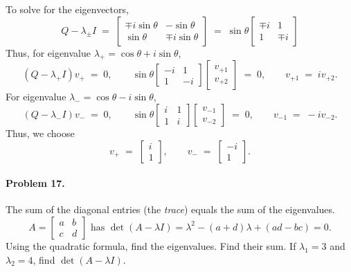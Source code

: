 \documentclass[10pt]{article}
\begin{document}
        To solve for the eigenvectors,
        \[
        Q - \lambda_{\pm}I \;=\; \begin{bmatrix}
                \mp i\sin\theta & -\sin\theta \\ \sin\theta & \mp i\sin\theta
        \end{bmatrix}
        \;=\; \sin\theta \begin{bmatrix}
                \mp i & 1 \\ 1 & \mp i
        \end{bmatrix}
        \]
        Thus, for eigenvalue $\lambda_+ = \cos\theta + i\sin\theta$,
        \[
                (Q - \lambda_+I)v_+ \;=\; 0, \quad\quad \sin\theta \begin{bmatrix}
                        -i & 1 \\ 1 & -i
                \end{bmatrix} \begin{bmatrix}
                        v_{+1} \\ v_{+2}
                \end{bmatrix} \;=\; 0, \quad\quad
                v_{+1} \;=\; iv_{+2}.
        \]
        For eigenvalue $\lambda_- = \cos\theta - i\sin\theta$,
        \[
                (Q - \lambda_-I)v_- \;=\; 0, \quad\quad \sin\theta \begin{bmatrix}
                        i & 1 \\ 1 & i
                \end{bmatrix} \begin{bmatrix}
                        v_{-1} \\ v_{-2}
                \end{bmatrix} \;=\; 0, \quad\quad
                v_{-1} \;=\; -iv_{-2}.
        \]
        Thus, we choose
        \[
                v_+ \;=\; \begin{bmatrix}
                        i \\ 1
                \end{bmatrix}, \quad\quad
                v_- \;=\; \begin{bmatrix}
                        -i \\ 1
                \end{bmatrix}.
        \]



        \paragraph{Problem 17.}
        The sum of the diagonal entries (the \textit{trace}) equals the sum of the eigenvalues.
        \[
        A = \begin{bmatrix}
                a & b \\ c & d
        \end{bmatrix}
        \text { has } \det(A - \lambda I) = \lambda^2 - (a + d)\lambda + (ad - bc) = 0.
        \]
        Using the quadratic formula, find the eigenvalues.
        Find their sum. If $\lambda_1 = 3$ and $\lambda_2 = 4$, find $\det(A - \lambda I)$.
\end{document}
